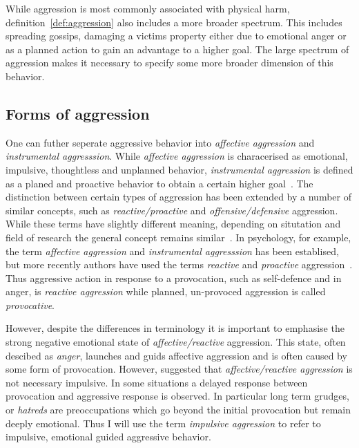 While aggression is most commonly associated with physical harm, definition~\ref{def:aggression} also includes a more broader spectrum.
This includes spreading gossips, damaging a victims property either due to emotional anger or as a planned action to gain an advantage to a higher goal.
The large spectrum of aggression makes it necessary to specify some more broader dimension of this behavior.

\subsection{Forms of aggression}
\label{sub:forms_of_aggression}

One can futher seperate aggressive behavior into \textit{affective aggression} and \textit{instrumental aggresssion}.
While \textit{affective aggression} is characerised as emotional, impulsive, thoughtless and unplanned behavior, \textit{instrumental aggression} is defined as a planed and proactive behavior to obtain a certain higher goal~\cite{Berkowitz1993,Geen2001}.
The distinction between certain types of aggression has been extended by a number of similar concepts, such as \textit{reactive/proactive} and \textit{offensive/defensive} aggression.
While these terms have slightly different meaning, depending on situtation and field of research the general concept remains similar~\cite{Geen2001, Blanchard2005b}.
In psychology, for example, the term \textit{affective aggression} and \textit{instrumental aggresssion} has been establised, but more recently authors have used the terms \textit{reactive} and \textit{proactive} aggression~\cite{Geen2001}.
Thus aggressive action in response to a provocation, such as self-defence and in anger, is \textit{reactive aggression} while planned, un-provoced aggression is called \textit{provocative}.

However, despite the differences in terminology it is important to emphasise the strong negative emotional state of \textit{affective/reactive} aggression.
This state, often descibed as \textit{anger}, launches and guids affective aggression  and is often caused by some form of provocation\cite{Geen2001}.
However, \citet{Frijda1994} suggested that \textit{affective/reactive aggression} is not necessary impulsive.
In some situations a delayed response between provocation and aggressive response is observed. 
In particular long term grudges, or \textit{hatreds} are preoccupations which go beyond the initial provocation but remain deeply emotional.
Thus I will use the term \textit{impulsive aggression} to refer to impulsive, emotional guided aggressive behavior.

